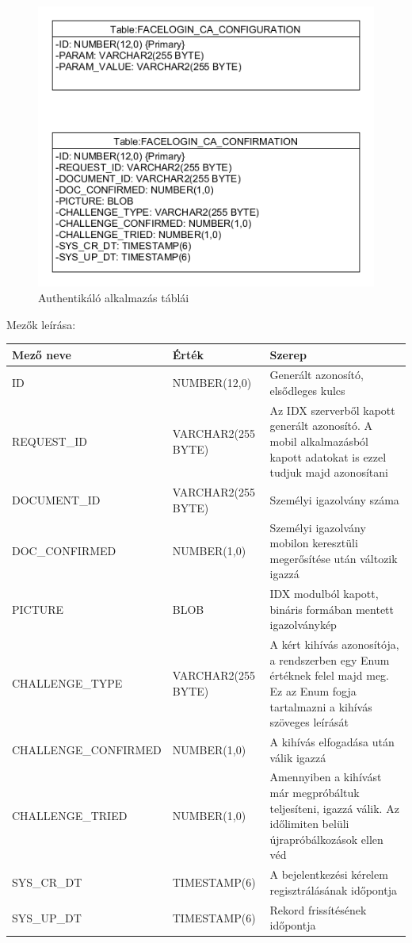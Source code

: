 \begin{figure}[h]
 \begin{minipage}{1\textwidth} 
\centering
    \includegraphics[scale=0.8]{img/facelogin_ca_db}
    \caption{Authentikáló alkalmazás táblái}
 \end{minipage}
\end{figure}
\newpage
Mezők leírása:

\begin{tabular}{|p{5.5cm}|p{3cm} |p{6cm}|}
   	\hline
	\textbf{Mező neve} & \textbf{Érték} & \textbf{Szerep}\\ \hline
	ID & NUMBER(12,0) & Generált azonosító, elsődleges kulcs \\ \hline
	REQUEST\_ID & VARCHAR2(255 BYTE) & Az IDX szerverből kapott generált azonosító. A mobil alkalmazásból kapott adatokat is ezzel tudjuk majd azonosítani \\ \hline
	DOCUMENT\_ID & VARCHAR2(255 BYTE)& Személyi igazolvány száma \\ \hline
	DOC\_CONFIRMED & NUMBER(1,0) & Személyi igazolvány mobilon keresztüli megerősítése után változik igazzá\\ \hline
	PICTURE & BLOB & IDX modulból kapott, bináris formában mentett igazolványkép\\ \hline
	CHALLENGE\_TYPE & VARCHAR2(255 BYTE)& A kért kihívás azonosítója, a rendszerben egy Enum értéknek felel majd meg. Ez az Enum fogja tartalmazni a kihívás szöveges leírását \\ \hline
	CHALLENGE\_CONFIRMED & NUMBER(1,0)& A kihívás elfogadása után válik igazzá \\ \hline
	CHALLENGE\_TRIED & NUMBER(1,0) & Amennyiben a kihívást már megpróbáltuk teljesíteni, igazzá válik. Az időlimiten belüli újrapróbálkozások ellen véd \\ \hline
	SYS\_CR\_DT & TIMESTAMP(6)& A bejelentkezési kérelem regisztrálásának időpontja \\ \hline
	SYS\_UP\_DT & TIMESTAMP(6)& Rekord frissítésének időpontja \\ \hline
\end{tabular}

